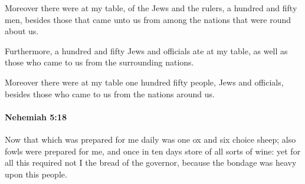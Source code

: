 			\begin{versebox}
					\item[BHS] 
					\item[LXX] 
					\item[ASV] Moreover there were at my table, of the Jews and the rulers, a hundred and fifty men, besides those that came unto us from among the nations that were round about us.
					\item[NIV] Furthermore, a hundred and fifty Jews and officials ate at my table, as well as those who came to us from the surrounding nations.
					\item[NRSV] Moreover there were at my table one hundred fifty people, Jews and officials, besides those who came to us from the nations around us.
			\end{versebox}

		\paragraph{Nehemiah 5:18} %
			\label{NEHEMIAH-5-18}

			Now that which was prepared for me daily was one ox and six choice sheep; also fowls were prepared for me, and once in ten days store of all sorts of wine: yet for all this required not I the bread of the governor, because the bondage was heavy upon this people.

